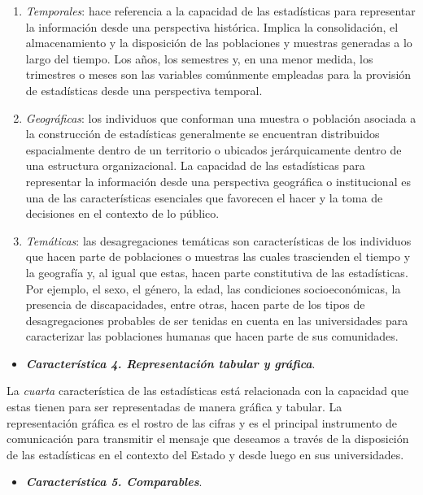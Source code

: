 \documentclass[
]{book}
\providecommand{\tightlist}{%
  \setlength{\itemsep}{0pt}\setlength{\parskip}{0pt}}
\begin{document}
\begin{enumerate}
\def\labelenumi{\arabic{enumi}.}
\item
  \emph{Temporales}: hace referencia a la capacidad de las estadísticas para representar la información desde una perspectiva histórica. Implica la consolidación, el almacenamiento y la disposición de las poblaciones y muestras generadas a lo largo del tiempo. Los años, los semestres y, en una menor medida, los trimestres o meses son las variables comúnmente empleadas para la provisión de estadísticas desde una perspectiva temporal.
\item
  \emph{Geográficas}: los individuos que conforman una muestra o población asociada a la construcción de estadísticas generalmente se encuentran distribuidos espacialmente dentro de un territorio o ubicados jerárquicamente dentro de una estructura organizacional. La capacidad de las estadísticas para representar la información desde una perspectiva geográfica o institucional es una de las características esenciales que favorecen el hacer y la toma de decisiones en el contexto de lo público.
\item
  \emph{Temáticas}: las desagregaciones temáticas son características de los individuos que hacen parte de poblaciones o muestras las cuales trascienden el tiempo y la geografía y, al igual que estas, hacen parte constitutiva de las estadísticas. Por ejemplo, el sexo, el género, la edad, las condiciones socioeconómicas, la presencia de discapacidades, entre otras, hacen parte de los tipos de desagregaciones probables de ser tenidas en cuenta en las universidades para caracterizar las poblaciones humanas que hacen parte de sus comunidades.
\end{enumerate}

\begin{itemize}
\tightlist
\item
  \textbf{\emph{Característica 4. Representación tabular y gráfica}}.
\end{itemize}

La \emph{cuarta} característica de las estadísticas está relacionada con la capacidad que estas tienen para ser representadas de manera gráfica y tabular. La representación gráfica es el rostro de las cifras y es el principal instrumento de comunicación para transmitir el mensaje que deseamos a través de la disposición de las estadísticas en el contexto del Estado y desde luego en sus universidades.

\begin{itemize}
\tightlist
\item
  \textbf{\emph{Característica 5. Comparables}}.
\end{itemize}
\end{document}
